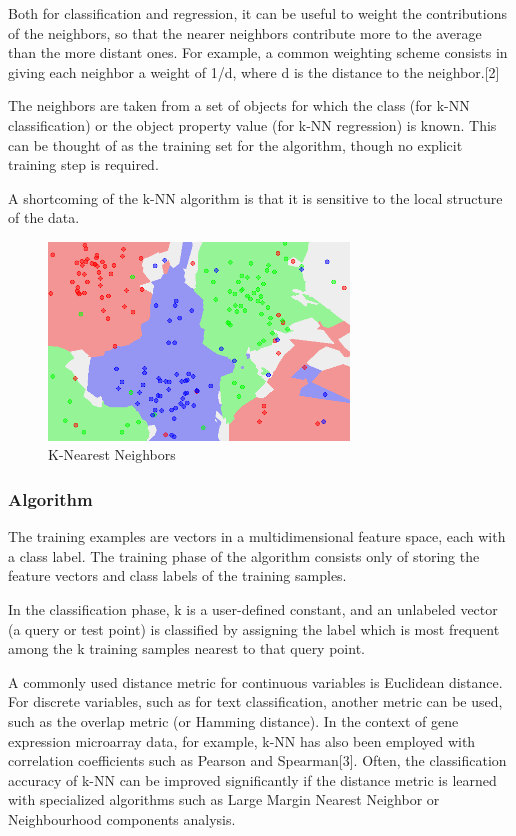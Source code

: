 \documentclass[12pt]{book}
\begin{document}
Both for classification and regression, it can be useful to weight the contributions of the neighbors, so that the nearer neighbors contribute more to the average than the more distant ones. For example, a common weighting scheme consists in giving each neighbor a weight of 1/d, where d is the distance to the neighbor.[2]

The neighbors are taken from a set of objects for which the class (for k-NN classification) or the object property value (for k-NN regression) is known. This can be thought of as the training set for the algorithm, though no explicit training step is required.

A shortcoming of the k-NN algorithm is that it is sensitive to the local structure of the data.

\begin{figure}[H]
\centering
\includegraphics[width=8cm]{Map5NN.png}
\caption{K-Nearest Neighbors\cite{wikipedia-knn}}
\label{fig:figure4}
\end{figure}



\subsubsection{Algorithm}
The training examples are vectors in a multidimensional feature space, each with a class label. The training phase of the algorithm consists only of storing the feature vectors and class labels of the training samples.

In the classification phase, k is a user-defined constant, and an unlabeled vector (a query or test point) is classified by assigning the label which is most frequent among the k training samples nearest to that query point.

A commonly used distance metric for continuous variables is Euclidean distance. For discrete variables, such as for text classification, another metric can be used, such as the overlap metric (or Hamming distance). In the context of gene expression microarray data, for example, k-NN has also been employed with correlation coefficients such as Pearson and Spearman[3]. Often, the classification accuracy of k-NN can be improved significantly if the distance metric is learned with specialized algorithms such as Large Margin Nearest Neighbor or Neighbourhood components analysis.
\end{document}
